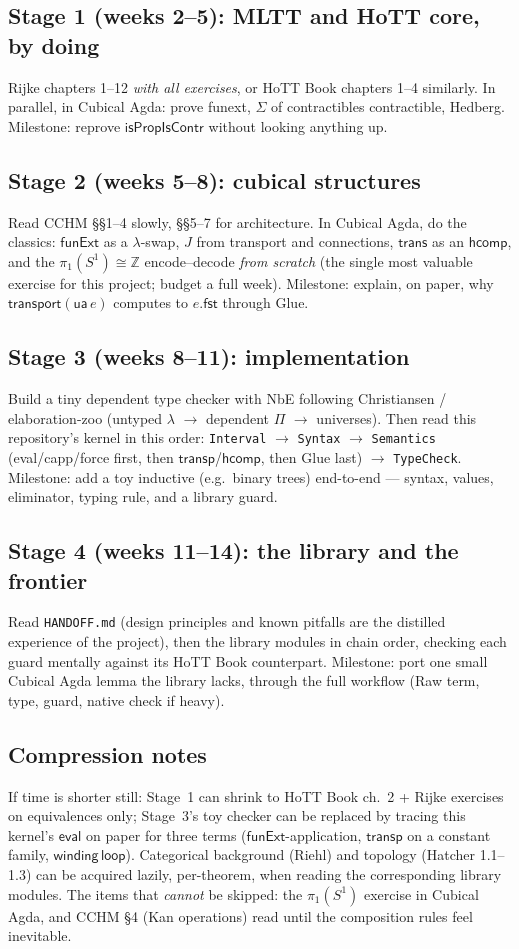 \documentclass[11pt]{article}
\newcommand{\op}[1]{\ensuremath{\mathsf{#1}}}
\newcommand{\Z}{\mathbb{Z}}
\begin{document}
\subsection*{Stage 1 (weeks 2--5): MLTT and HoTT core, by doing}
Rijke chapters 1--12 \emph{with all exercises}, or HoTT Book chapters
1--4 similarly.  In parallel, in Cubical Agda: prove funext, $\Sigma$ of
contractibles contractible, Hedberg.  Milestone: reprove
$\op{isPropIsContr}$ without looking anything up.

\subsection*{Stage 2 (weeks 5--8): cubical structures}
Read CCHM \S\S1--4 slowly, \S\S5--7 for architecture.  In Cubical Agda,
do the classics: $\op{funExt}$ as a $\lambda$-swap, $J$ from transport
and connections, $\op{trans}$ as an \op{hcomp}, and the
$\pi_1(S^1)\cong\Z$ encode--decode \emph{from scratch} (the single most
valuable exercise for this project; budget a full week).  Milestone:
explain, on paper, why $\op{transport}(\op{ua}\,e)$ computes to
$e.\op{fst}$ through Glue.

\subsection*{Stage 3 (weeks 8--11): implementation}
Build a tiny dependent type checker with NbE following Christiansen /
elaboration-zoo (untyped $\lambda$ $\to$ dependent $\Pi$ $\to$
universes).  Then read this repository's kernel in this order:
\texttt{Interval} $\to$ \texttt{Syntax} $\to$ \texttt{Semantics}
(eval/capp/force first, then \op{transp}/\op{hcomp}, then Glue last)
$\to$ \texttt{TypeCheck}.  Milestone: add a toy inductive (e.g.\ binary
trees) end-to-end --- syntax, values, eliminator, typing rule, and a
library guard.

\subsection*{Stage 4 (weeks 11--14): the library and the frontier}
Read \texttt{HANDOFF.md} (design principles and known pitfalls are the
distilled experience of the project), then the library modules in chain
order, checking each guard mentally against its HoTT Book counterpart.
Milestone: port one small Cubical Agda lemma the library lacks, through
the full workflow (Raw term, type, guard, native check if heavy).

\subsection*{Compression notes}
If time is shorter still: Stage~1 can shrink to HoTT Book ch.\ 2 + Rijke
exercises on equivalences only; Stage~3's toy checker can be replaced by
tracing this kernel's \op{eval} on paper for three terms
($\op{funExt}$-application, $\op{transp}$ on a constant family,
$\op{winding}\,\op{loop}$).  Categorical background (Riehl) and topology
(Hatcher 1.1--1.3) can be acquired lazily, per-theorem, when reading the
corresponding library modules.  The items that \emph{cannot} be skipped:
the $\pi_1(S^1)$ exercise in Cubical Agda, and CCHM \S4 (Kan operations)
read until the composition rules feel inevitable.
\end{document}
